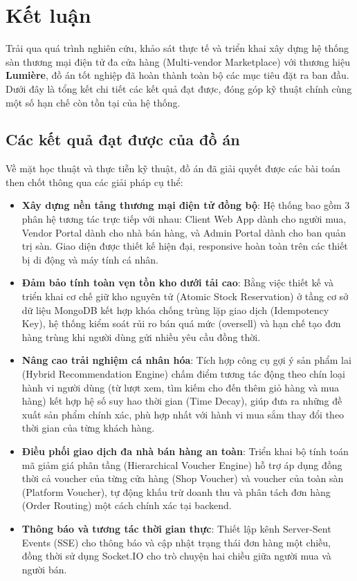 \documentclass[../DoAn.tex]{subfiles}
\begin{document}
\section{Kết luận}

Trải qua quá trình nghiên cứu, khảo sát thực tế và triển khai xây dựng hệ thống sàn thương mại điện tử đa cửa hàng (Multi-vendor Marketplace) với thương hiệu \textbf{Lumière}, đồ án tốt nghiệp đã hoàn thành toàn bộ các mục tiêu đặt ra ban đầu. Dưới đây là tổng kết chi tiết các kết quả đạt được, đóng góp kỹ thuật chính cùng một số hạn chế còn tồn tại của hệ thống.

\subsection{Các kết quả đạt được của đồ án}

Về mặt học thuật và thực tiễn kỹ thuật, đồ án đã giải quyết được các bài toán then chốt thông qua các giải pháp cụ thể:
\begin{itemize}
    \item \textbf{Xây dựng nền tảng thương mại điện tử đồng bộ}: Hệ thống bao gồm 3 phân hệ tương tác trực tiếp với nhau: Client Web App dành cho người mua, Vendor Portal dành cho nhà bán hàng, và Admin Portal dành cho ban quản trị sàn. Giao diện được thiết kế hiện đại, responsive hoàn toàn trên các thiết bị di động và máy tính cá nhân.
    \item \textbf{Đảm bảo tính toàn vẹn tồn kho dưới tải cao}: Bằng việc thiết kế và triển khai cơ chế giữ kho nguyên tử (Atomic Stock Reservation) ở tầng cơ sở dữ liệu MongoDB kết hợp khóa chống trùng lặp giao dịch (Idempotency Key), hệ thống kiểm soát rủi ro bán quá mức (oversell) và hạn chế tạo đơn hàng trùng khi người dùng gửi nhiều yêu cầu đồng thời.
    \item \textbf{Nâng cao trải nghiệm cá nhân hóa}: Tích hợp công cụ gợi ý sản phẩm lai (Hybrid Recommendation Engine) chấm điểm tương tác động theo chín loại hành vi người dùng (từ lượt xem, tìm kiếm cho đến thêm giỏ hàng và mua hàng) kết hợp hệ số suy hao thời gian (Time Decay), giúp đưa ra những đề xuất sản phẩm chính xác, phù hợp nhất với hành vi mua sắm thay đổi theo thời gian của từng khách hàng.
    \item \textbf{Điều phối giao dịch đa nhà bán hàng an toàn}: Triển khai bộ tính toán mã giảm giá phân tầng (Hierarchical Voucher Engine) hỗ trợ áp dụng đồng thời cả voucher của từng cửa hàng (Shop Voucher) và voucher của toàn sàn (Platform Voucher), tự động khấu trừ doanh thu và phân tách đơn hàng (Order Routing) một cách chính xác tại backend.
    \item \textbf{Thông báo và tương tác thời gian thực}: Thiết lập kênh Server-Sent Events (SSE) cho thông báo và cập nhật trạng thái đơn hàng một chiều, đồng thời sử dụng Socket.IO cho trò chuyện hai chiều giữa người mua và người bán.
\end{itemize}
\end{document}
